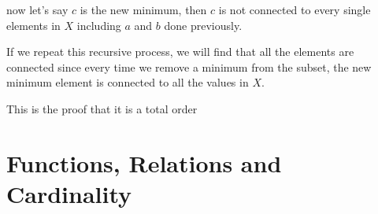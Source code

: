 \documentclass[12pts,A4]{article}
\begin{document}
\begin{flushleft}
    \bigskip

    now let's say $c$ is the new minimum, then $c$ is not connected to every single elements in $X$ including $a$ and $b$ done previously.

    If we repeat this recursive process, we will find that all the elements are connected since every time we remove a minimum from the subset, the new minimum element is connected to all the values in $X$.
    
    \bigskip

    This is the proof that it is a total order 
     


    \end{flushleft} 

\section{Functions, Relations and Cardinality}
\end{document}
